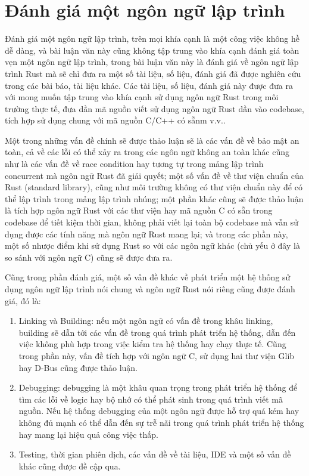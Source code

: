 \section{Đánh giá một ngôn ngữ lập trình}
Đánh giá một ngôn ngữ lập trình, trên mọi khía cạnh là một công việc không hề dễ dàng, và bài luận văn này cũng không tập trung vào khía cạnh đánh giá toàn vẹn một ngôn ngữ lập trình, trong bài luận văn này là đánh giá về ngôn ngữ lập trình Rust mà sẽ chỉ đưa ra một số tài liệu, số liệu, đánh giá đã được nghiên cứu trong các bài báo, tài liệu khác.
Các tài liệu, số liệu, đánh giá này được đưa ra với mong muốn tập trung vào khía cạnh sử dụng ngôn ngữ Rust trong môi trường thực tế, đưa dần mã nguồn viết sử dụng ngôn ngữ Rust dần vào codebase, tích hợp sử dụng chung với mã nguồn C/C++ có sẵnm v.v..

Một trong những vấn đề chính sẽ được thảo luận sẽ là các vấn đề về bảo mật an toàn, cả về các lỗi có thể xảy ra trong các ngôn ngữ không an toàn khác cũng như là các vấn đề về race condition hay tương tự trong mảng lập trình concurrent mà ngôn ngữ Rust đã giải quyết; một số vấn đề về thư viện chuẩn của Rust (standard library), cũng như môi trường không có thư viện chuẩn này để có thể lập trình trong mảng lập trình nhúng; một phần khác cũng sẽ được thảo luận là tích hợp ngôn ngữ Rust với các thư viện hay mã nguồn C có sẵn trong codebase để tiết kiệm thời gian, không phải viết lại toàn bộ codebase mà vẫn sử dụng được các tính năng mà ngôn ngữ Rust mang lại; và trong các phần này, một số nhược điểm khi sử dụng Rust so với các ngôn ngữ khác (chủ yếu ở đây là so sánh với ngôn ngữ C) cũng sẽ được đưa ra.

Cũng trong phần đánh giá, một số vấn đề khác về phát triển một hệ thống sử dụng ngôn ngữ lập trình nói chung và ngôn ngữ Rust nói riêng cũng được đánh giá, đó là:

\begin{enumerate}
    \item Linking và Building: nếu một ngôn ngữ có vấn đề trong khâu linking, building sẽ dẫn tới các vấn đề trong quá trình  phát triển hệ thống, dẫn đến việc không phù hợp trong việc kiểm tra hệ thống hay chạy thực tế. Cũng trong phần này, vấn đề tích hợp với ngôn ngữ C, sử dụng hai thư viện Glib hay D-Bus cũng được thảo luận.

    \item Debugging: debugging là một khâu quan trọng trong phát triển hệ thống để tìm các lỗi về logic hay bộ nhớ có thể phát sinh trong quá trình viết mã nguồn.
Nếu hệ thống debugging của một ngôn ngữ được hỗ trợ quá kém hay không đủ mạnh có thể dẫn đến sự trễ nãi trong quá trình phát triển hệ thống hay mang lại hiệu quả công việc thấp.

    \item Testing, thời gian phiên dịch, các vấn đề về tài liệu, IDE và một số vấn đề khác cũng được đề cập qua.
\end{enumerate}

